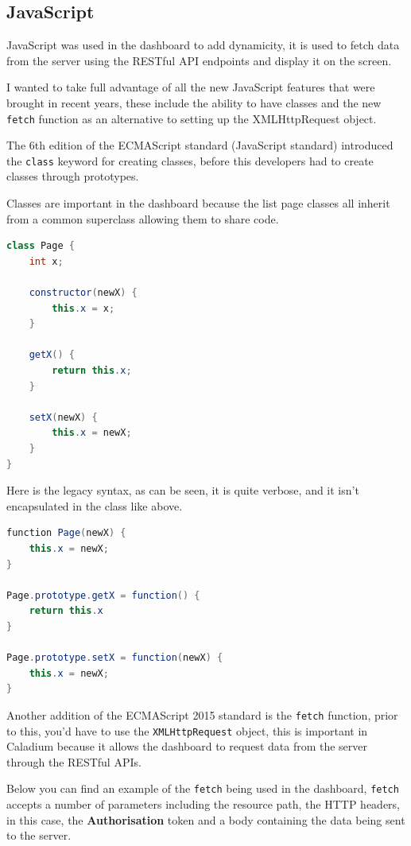 \subsection{JavaScript}
JavaScript was used in the dashboard to add dynamicity,
it is used to fetch data from the server using the RESTful API endpoints
and display it on the screen.

I wanted to take full advantage of all the new
JavaScript features that were brought in
recent years, these include the ability to have classes and
the new \texttt{fetch} function as an alternative to
setting up the XMLHttpRequest object.

The 6th edition of the ECMAScript standard \cite{ES6} (JavaScript standard) 
introduced the \texttt{class} keyword for creating classes,
before this developers had to create classes through prototypes.

Classes are important in the dashboard because the list page classes
all inherit from a common superclass allowing them to share code.

\begin{lstlisting}[language=Java]
class Page {
    int x;

    constructor(newX) {
        this.x = x;
    }

    getX() {
        return this.x;
    }

    setX(newX) {
        this.x = newX;
    }
}
\end{lstlisting}

Here is the legacy syntax, as can be seen, it is quite verbose,
and it isn't encapsulated in the class like above.

\begin{lstlisting}[language=Java]
function Page(newX) {
    this.x = newX;
}

Page.prototype.getX = function() {
    return this.x
}

Page.prototype.setX = function(newX) {
    this.x = newX;
}
\end{lstlisting}

Another addition of the ECMAScript 2015 standard is the \texttt{fetch} function,
prior to this, you'd have to use the \texttt{XMLHttpRequest} object,
this is important in Caladium because it allows the dashboard to
request data from the server through the RESTful APIs.

Below you can find an example of the \texttt{fetch}
being used in the dashboard,
\texttt{fetch} accepts a number of parameters including the resource path,
the HTTP headers, in this case, the \textbf{Authorisation}
token and a body containing the data being sent to the server.

